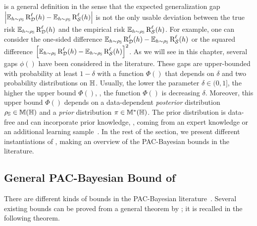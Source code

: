 is a general definition in the sense that the expected generalization gap  $\left\vert\operatorname*{\mathbb{E}}_{h\sim\rho_{\mathbb{S}}}\text{R}^{\ell}_{\mathcal{D}}(h)-\operatorname*{\mathbb{E}}_{h\sim\rho_{\mathbb{S}}}\text{R}^{\ell}_{\mathcal{S}}(h)\right\vert$ is not the only usable deviation between the true risk $\operatorname*{\mathbb{E}}_{h\sim\rho_{\mathbb{S}}}\text{R}^{\ell}_{\mathcal{D}}(h)$ and the empirical risk $\operatorname*{\mathbb{E}}_{h\sim\rho_{\mathbb{S}}}\text{R}^{\ell}_{\mathcal{S}}(h)$.
For example, one can consider the one-sided difference $\operatorname*{\mathbb{E}}_{h\sim\rho_{\mathbb{S}}}\text{R}^{\ell}_{\mathcal{D}}(h)-\operatorname*{\mathbb{E}}_{h\sim\rho_{\mathbb{S}}}\text{R}^{\ell}_{\mathcal{S}}(h)$ or the squared difference $\left[\operatorname*{\mathbb{E}}_{h\sim\rho_{\mathbb{S}}}\text{R}^{\ell}_{\mathcal{D}}(h)-\operatorname*{\mathbb{E}}_{h\sim\rho_{\mathbb{S}}}\text{R}^{\ell}_{\mathcal{S}}(h)\right]^2$.
As we will see in this chapter, several gaps $\phi()$ have been considered in the literature.
These gaps are upper-bounded with probability at least $1{-}\delta$ with a function $\Phi()$ that depends on $\delta$ and two probability distributions on $\mathbb{H}$.
Usually, the lower the parameter $\delta\in(0, 1]$, the higher the upper bound $\Phi()$, \ie, the function $\Phi()$ is decreasing \wrt $\delta$.
Moreover, this upper bound $\Phi()$ depends on a data-dependent {\it posterior} distribution $\rho_{\mathbb{S}}\in\mathbb{M}(\mathbb{H})$ and a {\it prior} distribution $\pi\in\mathbb{M}^{*}(\mathbb{H})$.
The prior distribution is data-free and can incorporate prior knowledge, \eg, coming from an expert knowledge or an additional learning sample~\citep{ParradoHernandezAmbroladzeShaweTaylorSun2012,DziugaiteHsuGharbiehArpinoRoy2021}.
In the rest of the section, we present different instantiations of , making an overview of the PAC-Bayesian bounds in the literature.

\subsection{General PAC-Bayesian Bound of \citet{GermainLacasseLavioletteMarchand2009}}

There are different kinds of bounds in the PAC-Bayesian literature~\citep[\eg,][]{Seeger2002, McAllester2003, Catoni2007}. 
Several existing bounds can be proved from a general theorem by \citet{GermainLacasseLavioletteMarchand2009}; it is recalled in the following theorem.

